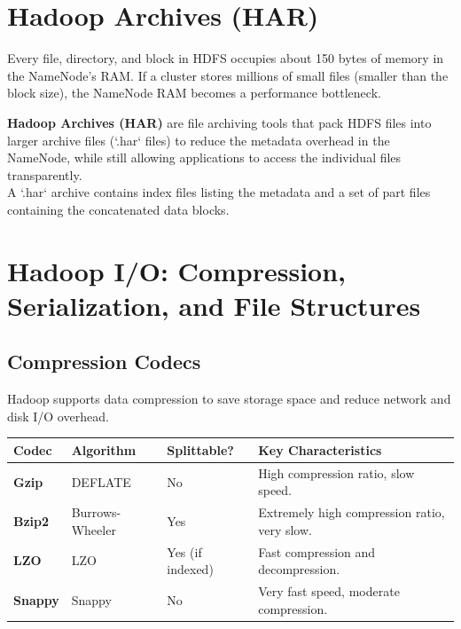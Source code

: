 \documentclass[12pt,a4paper]{article}
\renewcommand{\arraystretch}{1.45}
\begin{document}
\section{Hadoop Archives (HAR)}

Every file, directory, and block in HDFS occupies about 150 bytes of memory in the NameNode's RAM. If a cluster stores millions of small files (smaller than the block size), the NameNode RAM becomes a performance bottleneck.

\begin{tcolorbox}[defbox, title={Hadoop Archives (HAR)}]
  \textbf{Hadoop Archives (HAR)} are file archiving tools that pack HDFS files into larger archive files (`.har` files) to reduce the metadata overhead in the NameNode, while still allowing applications to access the individual files transparently.
\\
A `.har` archive contains index files listing the metadata and a set of part files containing the concatenated data blocks.
\end{tcolorbox}

\section{Hadoop I/O: Compression, Serialization, and File Structures}

\subsection{Compression Codecs}
Hadoop supports data compression to save storage space and reduce network and disk I/O overhead.

\par\vspace{6pt}\noindent
{\renewcommand{\arraystretch}{1.4}%
\begin{tabularx}{\linewidth}{|B{2.5cm}|Y|Y|Y|}
\hline
\textbf{Codec} & \textbf{Algorithm} & \textbf{Splittable?} & \textbf{Key Characteristics} \\
\hline
\textbf{Gzip} & DEFLATE & No & High compression ratio, slow speed. \\
\hline
\textbf{Bzip2} & Burrows-Wheeler & Yes & Extremely high compression ratio, very slow. \\
\hline
\textbf{LZO} & LZO & Yes (if indexed) & Fast compression and decompression. \\
\hline
\textbf{Snappy} & Snappy & No & Very fast speed, moderate compression. \\
\hline
\end{tabularx}}
\end{document}
